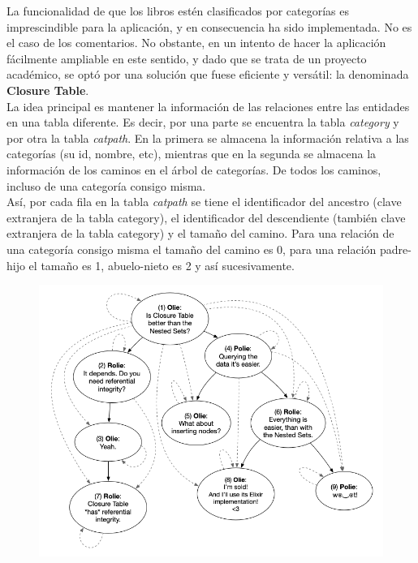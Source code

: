 \documentclass[a4paper]{report}
\begin{document}
    La funcionalidad de que los libros estén clasificados por categorías es imprescindible para la aplicación, y en consecuencia ha sido implementada. No es el caso de los comentarios. No obstante, en un intento de hacer la aplicación fácilmente ampliable en este sentido, y dado que se trata de un proyecto académico, se optó por una solución que fuese eficiente y versátil: la denominada \textbf{Closure Table}.
    \\
    
    La idea principal es mantener la información de las relaciones entre las entidades en una tabla diferente. Es decir, por una parte se encuentra la tabla \emph{category} y por otra la tabla \emph{catpath}. En la primera se almacena la información relativa a las categorías (su id, nombre, etc), mientras que en la segunda se almacena la información de los caminos en el árbol de categorías. De todos los caminos, incluso de una categoría consigo misma.
    \\
    
    Así, por cada fila en la tabla \emph{catpath} se tiene el identificador del ancestro (clave extranjera de la tabla category), el identificador del descendiente (también clave extranjera de la tabla category) y el tamaño del camino. Para una relación de una categoría consigo misma el tamaño del camino es 0, para una relación padre-hijo el tamaño es 1, abuelo-nieto es 2 y así sucesivamente.
    
    \begin{figure}[t]
    	\centering
    	\includegraphics[width=\textwidth]{closure_table}
    \end{figure}
    
\end{document}
